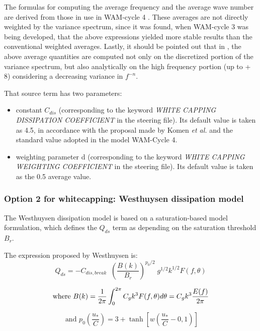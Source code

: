 The formulas for computing the average frequency and the average wave number
are derived from those in use in WAM-cycle 4 \cite{Komen1994}. These averages
are not directly weighted by the variance spectrum, since it was found, when
WAM-cycle 3 \cite {Wamdi1988} was being developed, that the above expressions
yielded more stable results than the conventional weighted averages. Lastly,
it should be pointed out that in \tomawac, the above average quantities are
computed not only on the discretized portion of the variance spectrum, but
also analytically on the high frequency portion (up to + 8) considering a
decreasing variance in $f^{-n}$.

That source term has two parameters:

\begin{itemize}
\item  constant $C_{dis}$ (corresponding to the keyword \textit{WHITE CAPPING
  DISSIPATION COEFFICIENT }in the steering file). Its default value is taken
  as 4.5, in accordance with the proposal made by Komen \textit{et al.}
  \cite{Komen1984} and the standard value adopted in the model WAM-Cycle 4.
\item  weighting parameter d (corresponding to the keyword \textit{WHITE
  CAPPING WEIGHTING COEFFICIENT} in the steering file). Its default value is
  taken as the 0.5 average value.
\end{itemize}

\subsubsection{Option 2 for whitecapping: Westhuysen dissipation model}
\label{parag4.3.3.2}
The Westhuysen dissipation model \cite{Westhuys2007} is based on a
saturation-based model formulation, which defines the $Q_{ds}$ term as
depending on the saturation threshold $B_r$.

 The expression proposed by Westhuysen is:
\begin{equation} \label{GrindEQ__4_40_}
  Q_{ds} =-C_{dis,break} \; \; \left(\frac{B(k)}{B_r } \right)^{p_{0} /2} \; g^{1/2}
  k^{1/2} F(f,\theta )
\end{equation}

$$\mbox{where }\displaystyle B(k)=\frac{1}{2\pi } \int _{0}^{2\pi }C_{g} k^{3} F(f,\theta )
d\theta  =C_{g} k^{3} \frac{E(f)}{2\pi } $$

$$\mbox{ and }p_{0} \left(\frac{u_* }{C} \right)=3+\tanh \left[w
  \left(\frac{u_* }{C} -0,1\right)\right]$$

